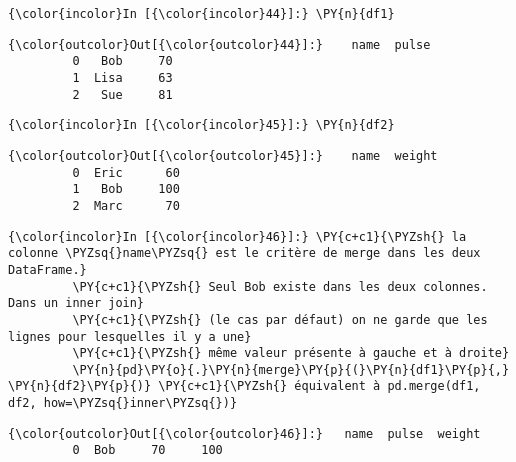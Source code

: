    \begin{Verbatim}[commandchars=\\\{\},frame=single,framerule=0.3mm,rulecolor=\color{cellframecolor}]
{\color{incolor}In [{\color{incolor}44}]:} \PY{n}{df1}
\end{Verbatim}


\begin{Verbatim}[commandchars=\\\{\},frame=single,framerule=0.3mm,rulecolor=\color{cellframecolor}]
{\color{outcolor}Out[{\color{outcolor}44}]:}    name  pulse
         0   Bob     70
         1  Lisa     63
         2   Sue     81
\end{Verbatim}
            
    \begin{Verbatim}[commandchars=\\\{\},frame=single,framerule=0.3mm,rulecolor=\color{cellframecolor}]
{\color{incolor}In [{\color{incolor}45}]:} \PY{n}{df2}
\end{Verbatim}


\begin{Verbatim}[commandchars=\\\{\},frame=single,framerule=0.3mm,rulecolor=\color{cellframecolor}]
{\color{outcolor}Out[{\color{outcolor}45}]:}    name  weight
         0  Eric      60
         1   Bob     100
         2  Marc      70
\end{Verbatim}
            
    \begin{Verbatim}[commandchars=\\\{\},frame=single,framerule=0.3mm,rulecolor=\color{cellframecolor}]
{\color{incolor}In [{\color{incolor}46}]:} \PY{c+c1}{\PYZsh{} la colonne \PYZsq{}name\PYZsq{} est le critère de merge dans les deux DataFrame.}
         \PY{c+c1}{\PYZsh{} Seul Bob existe dans les deux colonnes. Dans un inner join}
         \PY{c+c1}{\PYZsh{} (le cas par défaut) on ne garde que les lignes pour lesquelles il y a une}
         \PY{c+c1}{\PYZsh{} même valeur présente à gauche et à droite}
         \PY{n}{pd}\PY{o}{.}\PY{n}{merge}\PY{p}{(}\PY{n}{df1}\PY{p}{,} \PY{n}{df2}\PY{p}{)} \PY{c+c1}{\PYZsh{} équivalent à pd.merge(df1, df2, how=\PYZsq{}inner\PYZsq{})}
\end{Verbatim}


\begin{Verbatim}[commandchars=\\\{\},frame=single,framerule=0.3mm,rulecolor=\color{cellframecolor}]
{\color{outcolor}Out[{\color{outcolor}46}]:}   name  pulse  weight
         0  Bob     70     100
\end{Verbatim}
            
